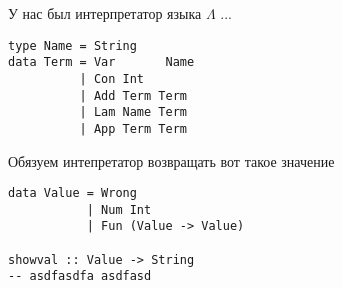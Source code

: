 \documentclass{beamer}
\begin{document}
\begin{frame}[fragile]{У нас был интерпретатор языка $\Lambda$ ...}
\begin{lstlisting}[style={hsstyle1}]
type Name = String
data Term = Var       Name  
          | Con Int  
          | Add Term Term  
          | Lam Name Term    
          | App Term Term
\end{lstlisting}

Обязуем интепретатор возвращать вот такое значение
\begin{lstlisting}[style={hsstyle1}]
data Value = Wrong  
           | Num Int  
           | Fun (Value -> Value)
           
showval :: Value -> String             
-- asdfasdfa asdfasd
\end{lstlisting}
\end{frame}
\end{document}
